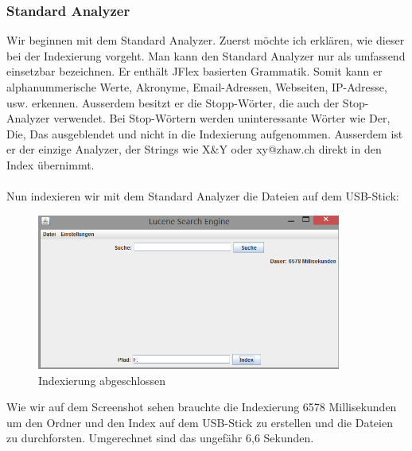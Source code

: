 \documentclass[12pt,a4paper,ngerman]{report}
\begin{document}
\subsubsection*{Standard Analyzer}
Wir beginnen mit dem Standard Analyzer. Zuerst möchte ich erklären, wie dieser bei der Indexierung vorgeht. Man kann den Standard Analyzer nur als umfassend einsetzbar bezeichnen. Er enthält JFlex basierten Grammatik. Somit kann er alphanummerische Werte, Akronyme, Email-Adressen, Webseiten, IP-Adresse, usw. erkennen. Ausserdem besitzt er die Stopp-Wörter, die auch der Stop-Analyzer verwendet. Bei Stop-Wörtern werden uninteressante Wörter wie Der, Die, Das ausgeblendet und nicht in die Indexierung aufgenommen. Ausserdem ist er der einzige Analyzer, der Strings wie X\&Y oder xy@zhaw.ch direkt in den Index übernimmt.\\
\\
Nun indexieren wir mit dem Standard Analyzer die Dateien auf dem USB-Stick:
\begin{figure}[h!]
\centering
\includegraphics[width=10cm]{img/standard-analyzer-index.png}
\caption{Indexierung abgeschlossen\protect\footnotemark}
\end{figure}
Wie wir auf dem Screenshot sehen brauchte die Indexierung 6578 Millisekunden um den Ordner und den Index auf dem USB-Stick zu erstellen und die Dateien zu durchforsten. Umgerechnet sind das ungefähr 6,6 Sekunden.
\end{document}
